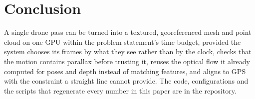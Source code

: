 \documentclass[10pt,a4paper,twocolumn]{article}
\begin{document}
\section{Conclusion}
A single drone pass can be turned into a textured, georeferenced mesh and point cloud on one GPU within the problem statement's time budget, provided the system chooses its frames by what they see rather than by the clock, checks that the motion contains parallax before trusting it, reuses the optical flow it already computed for poses and depth instead of matching features, and aligns to GPS with the constraint a straight line cannot provide. The code, configurations and the scripts that regenerate every number in this paper are in the repository.



\end{document}
